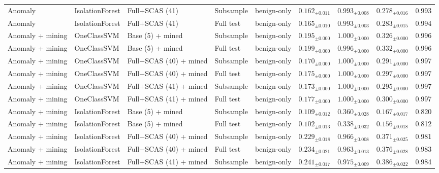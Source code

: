 \begin{longtable}{llllcccc}
\addlinespace
Anomaly & IsolationForest & Full$+$SCAS (41) & Subsample & benign-only & $0.162_{\pm 0.011}$ & $0.993_{\pm 0.008}$ & $0.278_{\pm 0.016}$ & 0.993 \\
\addlinespace
Anomaly & IsolationForest & Full$+$SCAS (41) & Full test & benign-only & $0.165_{\pm 0.010}$ & $0.993_{\pm 0.003}$ & $0.283_{\pm 0.015}$ & 0.994 \\
\addlinespace
Anomaly + mining & OneClassSVM & Base (5) + mined & Subsample & benign-only & $0.195_{\pm 0.000}$ & $1.000_{\pm 0.000}$ & $0.326_{\pm 0.000}$ & 0.996 \\
\addlinespace
Anomaly + mining & OneClassSVM & Base (5) + mined & Full test & benign-only & $0.199_{\pm 0.000}$ & $0.996_{\pm 0.000}$ & $0.332_{\pm 0.000}$ & 0.996 \\
\addlinespace
Anomaly + mining & OneClassSVM & Full$-$SCAS (40) + mined & Subsample & benign-only & $0.170_{\pm 0.000}$ & $1.000_{\pm 0.000}$ & $0.291_{\pm 0.000}$ & 0.997 \\
\addlinespace
Anomaly + mining & OneClassSVM & Full$-$SCAS (40) + mined & Full test & benign-only & $0.175_{\pm 0.000}$ & $1.000_{\pm 0.000}$ & $0.297_{\pm 0.000}$ & 0.997 \\
\addlinespace
Anomaly + mining & OneClassSVM & Full$+$SCAS (41) + mined & Subsample & benign-only & $0.173_{\pm 0.000}$ & $1.000_{\pm 0.000}$ & $0.295_{\pm 0.000}$ & 0.997 \\
\addlinespace
Anomaly + mining & OneClassSVM & Full$+$SCAS (41) + mined & Full test & benign-only & $0.177_{\pm 0.000}$ & $1.000_{\pm 0.000}$ & $0.300_{\pm 0.000}$ & 0.997 \\
\addlinespace
Anomaly + mining & IsolationForest & Base (5) + mined & Subsample & benign-only & $0.109_{\pm 0.012}$ & $0.360_{\pm 0.028}$ & $0.167_{\pm 0.017}$ & 0.820 \\
\addlinespace
Anomaly + mining & IsolationForest & Base (5) + mined & Full test & benign-only & $0.102_{\pm 0.013}$ & $0.338_{\pm 0.032}$ & $0.156_{\pm 0.018}$ & 0.812 \\
\addlinespace
Anomaly + mining & IsolationForest & Full$-$SCAS (40) + mined & Subsample & benign-only & $0.229_{\pm 0.018}$ & $0.966_{\pm 0.008}$ & $0.371_{\pm 0.025}$ & 0.981 \\
\addlinespace
Anomaly + mining & IsolationForest & Full$-$SCAS (40) + mined & Full test & benign-only & $0.234_{\pm 0.021}$ & $0.963_{\pm 0.013}$ & $0.376_{\pm 0.028}$ & 0.983 \\
\addlinespace
Anomaly + mining & IsolationForest & Full$+$SCAS (41) + mined & Subsample & benign-only & $0.241_{\pm 0.017}$ & $0.975_{\pm 0.009}$ & $0.386_{\pm 0.022}$ & 0.984 \\

\end{longtable}

